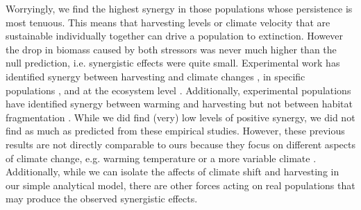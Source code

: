 \documentclass[12pt,english]{article}
\begin{document}
\begin{spacing}{1.9}
\begin{flushleft}
Worryingly, we find the highest synergy in those populations whose persistence is most tenuous.  This means that harvesting levels or climate velocity that are sustainable individually together can drive a population to extinction.  However the drop in biomass caused by both stressors was never much higher than the null prediction, i.e. synergistic effects were quite small. %
Experimental work has identified synergy between harvesting and climate changes \citep{Moraetal2007}, in specific populations \citep{Planque:2010uq}, and at the ecosystem level \citep{Kirby:2009fk,Planque:2010uq}.   Additionally, experimental populations have identified synergy between warming and harvesting but not between habitat fragmentation \citep{Moraetal2007}.    While we did find (very) low levels of positive synergy, we did not find as much as predicted from these empirical studies.  However, these previous results are not directly comparable to ours because they focus on different aspects of climate change, e.g. warming temperature \citep{Moraetal2007,Kirby:2009fk} or a more variable climate \citep{Planque:2010uq}.  Additionally, while we can isolate the affects of climate shift and harvesting in our simple analytical model, there are other forces acting on real populations that may produce the observed synergistic effects.




\end{flushleft}
\end{spacing}
\end{document}
